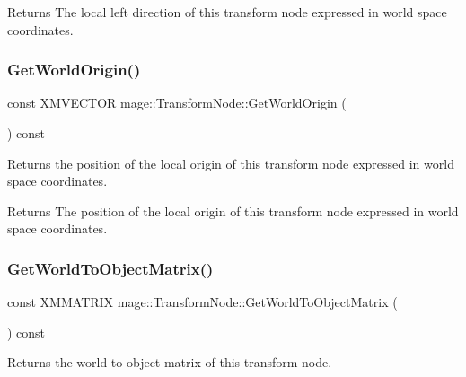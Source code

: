 \begin{DoxyReturn}{Returns}
The local left direction of this transform node expressed in world space coordinates. 
\end{DoxyReturn}
\hypertarget{structmage_1_1_transform_node_a481e03769590d147bbdf7dedf56a6e65}{}\label{structmage_1_1_transform_node_a481e03769590d147bbdf7dedf56a6e65} 
\subsubsection{\texorpdfstring{Get\+World\+Origin()}{GetWorldOrigin()}}
{\footnotesize\ttfamily const X\+M\+V\+E\+C\+T\+OR mage\+::\+Transform\+Node\+::\+Get\+World\+Origin (\begin{DoxyParamCaption}{ }\end{DoxyParamCaption}) const\hspace{0.3cm}{\ttfamily [noexcept]}}

Returns the position of the local origin of this transform node expressed in world space coordinates.

\begin{DoxyReturn}{Returns}
The position of the local origin of this transform node expressed in world space coordinates. 
\end{DoxyReturn}
\hypertarget{structmage_1_1_transform_node_abdad2523f50f398977abf8dd6c166d89}{}\label{structmage_1_1_transform_node_abdad2523f50f398977abf8dd6c166d89} 
\subsubsection{\texorpdfstring{Get\+World\+To\+Object\+Matrix()}{GetWorldToObjectMatrix()}}
{\footnotesize\ttfamily const X\+M\+M\+A\+T\+R\+IX mage\+::\+Transform\+Node\+::\+Get\+World\+To\+Object\+Matrix (\begin{DoxyParamCaption}{ }\end{DoxyParamCaption}) const\hspace{0.3cm}{\ttfamily [noexcept]}}

Returns the world-\/to-\/object matrix of this transform node.


